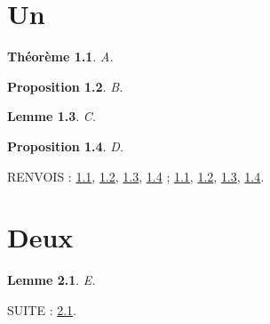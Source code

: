 \documentclass{scrbook}
\newtheorem{theoreme}{Théorème}[chapter]
\newtheorem{proposition}[theoreme]{Proposition}
\newtheorem{lemme}[theoreme]{Lemme}
\begin{document}
\chapter{Un}
\begin{theoreme}\label{t}A.\end{theoreme}
\begin{proposition}\label{p}B.\end{proposition}
\begin{lemme}\label{l}C.\end{lemme}
\begin{proposition}\label{p2}D.\end{proposition}
RENVOIS : \ref{t}, \ref{p}, \ref{l}, \ref{p2} ; \cref{t}, \cref{p}, \cref{l}, \cref{p2}.
\chapter{Deux}
\begin{lemme}\label{l2}E.\end{lemme}
SUITE : \cref{l2}.
\end{document}
